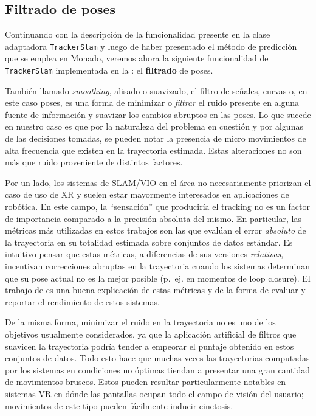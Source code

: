 \documentclass[ twoside,openright,titlepage,numbers=noenddot,%
                headinclude,footinclude,cleardoublepage=empty,abstract=on,
                BCOR=-5mm,paper=a4,fontsize=11pt
                ]{scrreprt}
\newcommand{\passthrough}[1]{#1}
\begin{document}
\FloatBarrier

\hypertarget{filtrado-de-poses}{%
\subsection{Filtrado de poses}\label{filtrado-de-poses}}

Continuando con la descripción de la funcionalidad presente en la clase
adaptadora \passthrough{\lstinline!TrackerSlam!} y luego de haber
presentado el método de predicción que se emplea en Monado, veremos
ahora la siguiente funcionalidad de
\passthrough{\lstinline!TrackerSlam!} implementada en la
: el \textbf{filtrado} de poses.

También llamado \emph{smoothing}, alisado o suavizado, el filtro de
señales, curvas o, en este caso poses, es una forma de minimizar o
\emph{filtrar} el ruido presente en alguna fuente de información y
suavizar los cambios abruptos en las poses. Lo que sucede en nuestro
caso es que por la naturaleza del problema en cuestión y por algunas de
las decisiones tomadas, se pueden notar la presencia de micro
movimientos de alta frecuencia que existen en la trayectoria estimada.
Estas alteraciones no son más que ruido proveniente de distintos
factores.

Por un lado, los sistemas de SLAM/VIO en el área no necesariamente
priorizan el caso de uso de XR y suelen estar mayormente interesados en
aplicaciones de robótica. En este campo, la ``sensación'' que produciría
el tracking no es un factor de importancia comparado a la precisión
absoluta del mismo. En particular, las métricas más utilizadas en estos
trabajos son las que evalúan el error \emph{absoluto} de la trayectoria
en su totalidad estimada sobre conjuntos de datos estándar. Es intuitivo
pensar que estas métricas, a diferencias de sus versiones
\emph{relativas}, incentivan correcciones abruptas en la trayectoria
cuando los sistemas determinan que su pose actual no es la mejor posible
(p.~ej. en momentos de loop closure). El trabajo de
\textcite{zhangTutorialQuantitativeTrajectory2018} es una buena
explicación de estas métricas y de la forma de evaluar y reportar el
rendimiento de estos sistemas.

De la misma forma, minimizar el ruido en la trayectoria no es uno de los
objetivos usualmente considerados, ya que la aplicación artificial de
filtros que suavicen la trayectoria podría tender a empeorar el puntaje
obtenido en estos conjuntos de datos. Todo esto hace que muchas veces
las trayectorias computadas por los sistemas en condiciones no óptimas
tiendan a presentar una gran cantidad de movimientos bruscos. Estos
pueden resultar particularmente notables en sistemas VR en dónde las
pantallas ocupan todo el campo de visión del usuario; movimientos de
este tipo pueden fácilmente inducir cinetosis.
\end{document}
